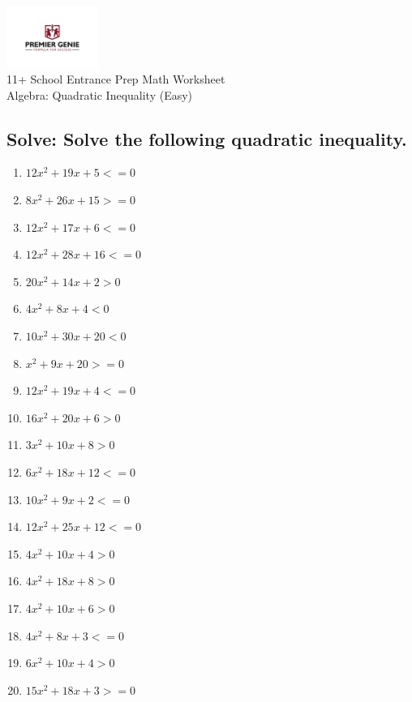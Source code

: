 \documentclass{article}
\begin{document}
\begin{center}
\includegraphics[width=3cm]{PREMGENIEJPG.jpg}\\
{\Large 11+ School Entrance Prep Math Worksheet}\\
{\Medium Algebra: Quadratic Inequality (Easy)}\\

\end{center}

\subsection*{Solve: Solve the following quadratic inequality.}

\begin{enumerate}
\item $\displaystyle 12 x^{2} + 19 x + 5<=0 $ \ 
\item $\displaystyle 8 x^{2} + 26 x + 15>=0 $ \ 
\item $\displaystyle 12 x^{2} + 17 x + 6<=0 $ \ 
\item $\displaystyle 12 x^{2} + 28 x + 16<=0 $ \ 
\item $\displaystyle 20 x^{2} + 14 x + 2>0 $ \ 
\item $\displaystyle 4 x^{2} + 8 x + 4<0 $ \ 
\item $\displaystyle 10 x^{2} + 30 x + 20<0 $ \ 
\item $\displaystyle x^{2} + 9 x + 20>=0 $ \ 
\item $\displaystyle 12 x^{2} + 19 x + 4<=0 $ \ 
\item $\displaystyle 16 x^{2} + 20 x + 6>0 $ \ 
\item $\displaystyle 3 x^{2} + 10 x + 8>0 $ \ 
\item $\displaystyle 6 x^{2} + 18 x + 12<=0 $ \ 
\item $\displaystyle 10 x^{2} + 9 x + 2<=0 $ \ 
\item $\displaystyle 12 x^{2} + 25 x + 12<=0 $ \ 
\item $\displaystyle 4 x^{2} + 10 x + 4>0 $ \ 
\item $\displaystyle 4 x^{2} + 18 x + 8>0 $ \ 
\item $\displaystyle 4 x^{2} + 10 x + 6>0 $ \ 
\item $\displaystyle 4 x^{2} + 8 x + 3<=0 $ \ 
\item $\displaystyle 6 x^{2} + 10 x + 4>0 $ \ 
\item $\displaystyle 15 x^{2} + 18 x + 3>=0 $ \ 


\end{enumerate}
\end{document}
